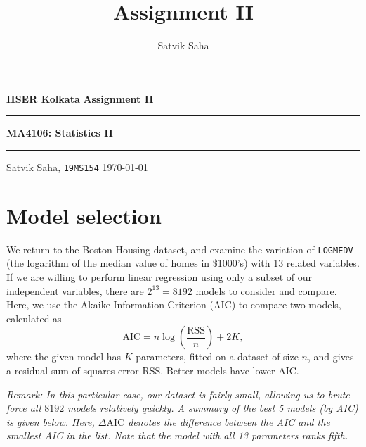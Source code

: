 \documentclass[10pt]{article}
\title{Assignment II}
\author{Satvik Saha}
\date{}
\begin{document}
    \noindent\textbf{IISER Kolkata} \hfill \textbf{Assignment II}
    \vspace{3pt}
    \hrule
    \vspace{3pt}
    \begin{center}
    \LARGE{\textbf{MA4106: Statistics II}}
    \end{center}
    \vspace{3pt}
    \hrule
    \vspace{3pt}
    Satvik Saha, \texttt{19MS154} \hfill \today
    \vspace{20pt}

    \setlength{\parskip}{1em}



    \section{Model selection}

    We return to the Boston Housing dataset, and examine the variation of
    \texttt{LOGMEDV} (the logarithm of the median value of homes in \$1000's) with 13
    related variables. If we are willing to perform linear regression using only a
    subset of our independent variables, there are $2^{13} = 8192$ models to
    consider and compare. Here, we use the Akaike Information Criterion (AIC) to
    compare two models, calculated as \[
        \text{AIC} = n\log\left(\frac{\text{RSS}}{n}\right) + 2K,
    \] where the given model has $K$ parameters, fitted on a dataset of size $n$, and
    gives a residual sum of squares error RSS. Better models have lower AIC.

    \textit{Remark: In this particular case, our dataset is fairly small, allowing us
    to brute force all $8192$ models relatively quickly. A summary of the best 5
    models (by AIC) is given below. Here, $\Delta\text{AIC}$ denotes the difference
    between the AIC and the smallest AIC in the list. Note that the model with all 13
    parameters ranks fifth.}
\end{document}
